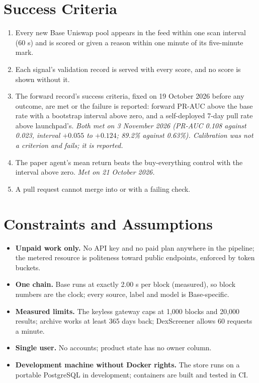 \section{Success Criteria}
\begin{enumerate}
  \item Every new Base Uniswap pool appears in the feed within one scan interval (60 s) and is scored or given a reason within one minute of its five-minute mark.
  \item Each signal's validation record is served with every score, and no score is shown without it.
  \item The forward record's success criteria, fixed on 19 October 2026 before any outcome, are met or the failure is reported: forward PR-AUC above the base rate with a bootstrap interval above zero, and a self-deployed 7-day pull rate above launchpad's. \emph{Both met on 3 November 2026 (PR-AUC 0.108 against 0.023, interval $+0.055$ to $+0.124$; 89.2\% against 0.63\%). Calibration was not a criterion and fails; it is reported.}
  \item The paper agent's mean return beats the buy-everything control with the interval above zero. \emph{Met on 21 October 2026.}
  \item A pull request cannot merge into  or  with a failing check.
\end{enumerate}

\section{Constraints and Assumptions}
\begin{itemize}
  \item \textbf{Unpaid work only.} No API key and no paid plan anywhere in the pipeline; the metered resource is politeness toward public endpoints, enforced by token buckets.
  \item \textbf{One chain.} Base runs at exactly 2.00 s per block (measured), so block numbers are the clock; every source, label and model is Base-specific.
  \item \textbf{Measured limits.} The keyless gateway caps  at 1,000 blocks and 20,000 results; archive  works at least 365 days back; DexScreener allows 60 requests a minute.
  \item \textbf{Single user.} No accounts; product state has no owner column.
  \item \textbf{Development machine without Docker rights.} The store runs on a portable PostgreSQL in development; containers are built and tested in CI.
\end{itemize}

